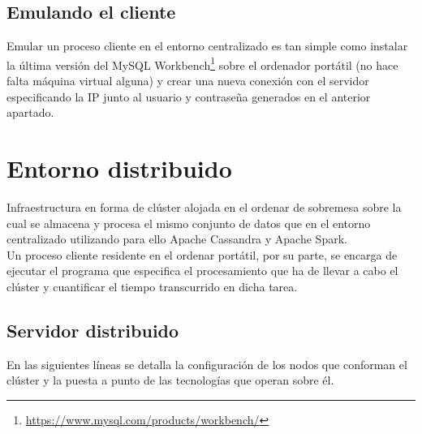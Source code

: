 \subsection{Emulando el cliente}

Emular un proceso cliente en el entorno centralizado es tan simple como instalar la última versión del MySQL Workbench\footnote{\url{https://www.mysql.com/products/workbench/}} sobre el ordenador portátil (no hace falta máquina virtual alguna) y crear una nueva conexión con el servidor especificando la IP junto al usuario y contraseña generados en el anterior apartado.

\section{Entorno distribuido}

Infraestructura en forma de clúster alojada en el ordenar de sobremesa sobre la cual se almacena y procesa el mismo conjunto de datos que en el entorno centralizado utilizando para ello Apache Cassandra y Apache Spark.\\ 

Un proceso cliente residente en el ordenar portátil, por su parte, se encarga de ejecutar el programa que especifica el procesamiento que ha de llevar a cabo el clúster y cuantificar el tiempo transcurrido en dicha tarea.

\subsection{Servidor distribuido}

En las siguientes líneas se detalla la configuración de los nodos que conforman el clúster y la puesta a punto de las tecnologías que operan sobre él.

